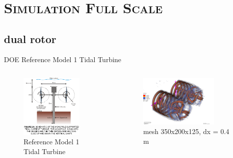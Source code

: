 \documentclass[xcolor=x11names,compress]{beamer}
\begin{document}
\section{\scshape Simulation Full Scale}

\subsection{dual rotor}

	\begin{frame}{DOE Reference Model 1 Tidal Turbine}
		
		\begin{columns}
		    
		    \begin{column}{0.6\textwidth}
		        \begin{figure}[p]
				    \centering
				    \includegraphics[width=0.8\textwidth]{figures/DOE-Reference-Model-1-Full-Scale-dual-rotor.PNG}
				    \caption{\scriptsize{Reference Model 1 Tidal Turbine}}
				\end{figure}

		    \end{column}
		    
		    \begin{column}{0.6\textwidth}
		        \begin{figure}[p]
				    \centering
				    \includegraphics[width=0.8\textwidth]{figures/fastFlume__dual-rotor-mesh=TunedMedium.png}
				    \caption{\scriptsize{mesh 350x200x125, dx = 0.4 m}}
				\end{figure}


\end{column}
\end{columns}
\end{frame}
\end{document}
